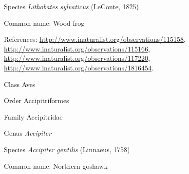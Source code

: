 \documentclass[9pt, article]{memoir}
\begin{document}
\begin{multicols}{2}
\vspace{6pt}\noindent\hspace{36pt}Species \textit{Lithobates sylvaticus} (LeConte, 1825)


Common name: Wood frog

References: 
\url{http://www.inaturalist.org/observations/115158}, 
\url{http://www.inaturalist.org/observations/115166}, 
\url{http://www.inaturalist.org/observations/117220}, 
\url{http://www.inaturalist.org/observations/1816454}.

\vspace{6pt}\noindent\hspace{12pt}Class Aves


\vspace{6pt}\noindent\hspace{18pt}Order Accipitriformes


\vspace{6pt}\noindent\hspace{24pt}Family Accipitridae


\vspace{6pt}\noindent\hspace{30pt}Genus \textit{Accipiter}


\vspace{6pt}\noindent\hspace{36pt}Species \textit{Accipiter gentilis} (Linnaeus, 1758)


Common name: Northern goshawk


\end{multicols}
\end{document}
